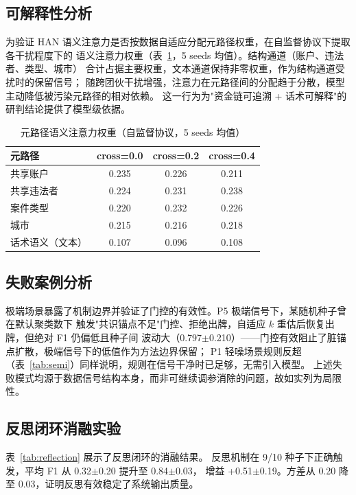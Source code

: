 \documentclass[12pt,a4paper,fontset=windows]{ctexart}
\begin{document}
\subsection{可解释性分析}

为验证 HAN 语义注意力是否按数据自适应分配元路径权重，在自监督协议下提取各干扰程度下的
语义注意力权重（表~\ref{tab:attn}，5 seeds 均值）。结构通道（账户、违法者、类型、城市）
合计占据主要权重，文本通道保持非零权重，作为结构通道受扰时的保留信号；
随跨团伙干扰增强，注意力在元路径间的分配趋于分散，模型主动降低被污染元路径的相对依赖。
这一行为为"资金链可追溯 + 话术可解释"的研判结论提供了模型级依据。

\begin{table}[htbp]
  \centering
  \caption{元路径语义注意力权重（自监督协议，5 seeds 均值）}
  \label{tab:attn}
  \begin{tabular}{lccc}
    \toprule
    元路径 & cross=0.0 & cross=0.2 & cross=0.4 \\
    \midrule
    共享账户 & 0.235 & 0.226 & 0.211 \\
    共享违法者 & 0.224 & 0.231 & 0.238 \\
    案件类型 & 0.220 & 0.232 & 0.226 \\
    城市 & 0.215 & 0.216 & 0.218 \\
    话术语义（文本） & 0.107 & 0.096 & 0.108 \\
    \bottomrule
  \end{tabular}
\end{table}

\subsection{失败案例分析}

极端场景暴露了机制边界并验证了门控的有效性。P5 极端信号下，某随机种子曾在默认聚类数下
触发"共识锚点不足"门控、拒绝出牌，自适应 $k$ 重估后恢复出牌，但绝对 F1 仍偏低且种子间
波动大（0.797$\pm$0.210）——门控有效阻止了脏锚点扩散，极端信号下的低值作为方法边界保留；
P1 轻噪场景规则反超（表~\ref{tab:semi}）同样说明，规则在信号干净时已足够，无需引入模型。
上述失败模式均源于数据信号结构本身，而非可继续调参消除的问题，故如实列为局限性。

\subsection{反思闭环消融实验}

表~\ref{tab:reflection} 展示了反思闭环的消融结果。
反思机制在 9/10 种子下正确触发，平均 F1 从 0.32$\pm$0.20 提升至 0.84$\pm$0.03，
增益 +0.51$\pm$0.19。方差从 0.20 降至 0.03，证明反思有效稳定了系统输出质量。
\end{document}
